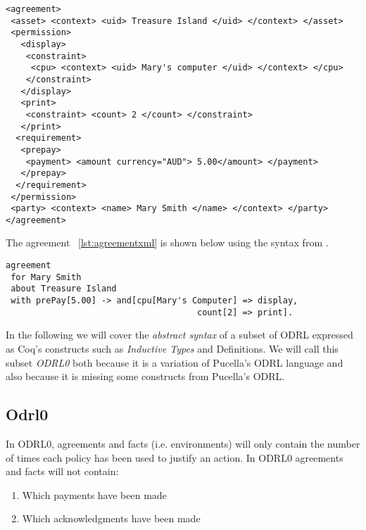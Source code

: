 \lstset{language=XML}
\begin{lstlisting}[caption={agreement for Mary Smith in XML},label={lst:agreementxml}]
<agreement>
 <asset> <context> <uid> Treasure Island </uid> </context> </asset>
 <permission>
   <display>
    <constraint>
     <cpu> <context> <uid> Mary's computer </uid> </context> </cpu>
    </constraint>
   </display>
   <print>
    <constraint> <count> 2 </count> </constraint>
   </print>
  <requirement>
   <prepay>
    <payment> <amount currency="AUD"> 5.00</amount> </payment>
   </prepay>
  </requirement>
 </permission>
 <party> <context> <name> Mary Smith </name> </context> </party>
</agreement>
\end{lstlisting}

The agreement ~\ref{lst:agreementxml} is shown below using the syntax from \cite{pucella2006}.

\lstset{language=Pucella2006}
\begin{minipage}[c]{0.95\textwidth}
\begin{lstlisting}[frame=single, caption={agreement for Mary Smith as BNF (as used in ~\cite{pucella2006})},label={lst:agreementpucella2006}]
agreement
 for Mary Smith 
 about Treasure Island 
 with prePay[5.00] -> and[cpu[Mary's Computer] => display,
                                      count[2] => print].
\end{lstlisting}
\end{minipage} 

In the following we will cover the \emph{abstract syntax} of a subset of ODRL expressed as Coq's constructs such as \emph{Inductive Types} and Definitions. We will call this subset \emph{ODRL0} both because it is a variation of Pucella's ODRL language and also because it is missing some constructs from Pucella's ODRL. 

\subsection{Odrl0}\label{subsec:odrl0}
In ODRL0, agreements and facts (i.e. environments) will only contain the number of times each policy has been used to justify an action. In ODRL0 agreements and facts will not contain: \begin{enumerate}
  \item Which payments have been made
  \item Which acknowledgments have been made
\end{enumerate} 

